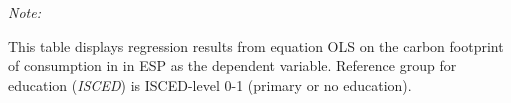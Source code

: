 \begin{table}[htbp!]
\begin{adjustbox}{width = 1\textwidth, max height = 0.95\textheight, center}
\begin{threeparttable}[b]
         \begin{tablenotes}\item \medskip \textit{Note:}
            \item This table displays regression results from equation OLS on the carbon footprint of consumption in  in ESP as the dependent variable.  Reference group for education (\textit{ISCED}) is ISCED-level 0-1 (primary or no education).
         \end{tablenotes}
      \end{threeparttable}
   \end{adjustbox}
\end{table}


